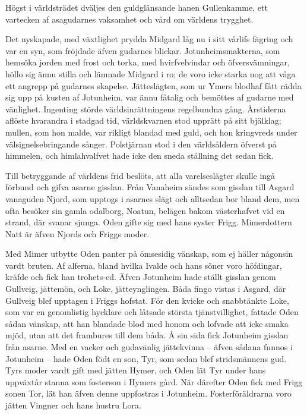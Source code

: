 Högst i världsträdet dväljes den guldglänsande hanen Gullenkamme, ett
vartecken af asagudarnes vaksamhet och vård om världens trygghet.






Det nyskapade, med växtlighet prydda Midgard låg nu i sitt vårlifs
fägring och var en syn, som fröjdade äfven gudarnes blickar.
Jotunheimsmakterna, som hemsöka jorden med frost och torka, med
hvirfvelvindar och öfversvämningar, höllo sig ännu stilla och lämnade
Midgard i ro; de voro icke starka nog att våga ett angrepp på gudarnes
skapelse. Jätteslägten, som ur Ymers blodhaf fått rädda sig upp på
kusten af Jotunheim, var ännu fåtalig och bemöttes af gudarne med
vänlighet. Ingenting störde världsinrättningens regelbundna gång.
Årstiderna aflöste hvarandra i stadgad tid, världskvarnen stod upprätt
på sitt bjälklag; mullen, som hon malde, var rikligt blandad med guld,
och hon kringvreds under välsignelsebringande sånger. Polstjärnan stod i
den världsåldern öfverst på himmelen, och himlahvalfvet hade icke den
sneda ställning det sedan fick.

Till betryggande af världens frid beslöts, att alla varelseslägter
skulle ingå förbund och gifva asarne gisslan. Från Vanaheim sändes som
gisslan till Asgard vanaguden Njord, som upptogs i asarnes slägt och
alltsedan bor bland dem, men ofta besöker sin gamla odalborg, Noatun,
belägen bakom västerhafvet vid en strand, där svanar sjunga. Oden gifte
sig med hans syster Frigg. Mimerdottern Natt är äfven Njords och Friggs
moder.

Med Mimer utbytte Oden panter på ömsesidig vänskap, som ej häller
någonsin vardt bruten. Af alferna, bland hvilka Ivalde och hans söner
voro höfdingar, kräfde och fick han trohets-ed. Äfven Jotunheim hade
ställt gisslan genom Gullveig, jättemön, och Loke, jätteynglingen. Båda
fingo vistas i Asgard, där Gullveig blef upptagen i Friggs hofstat. För
den kvicke och snabbtänkte Loke, som var en genomlistig hycklare och
låtsade största tjänstvillighet, fattade Oden sådan vänskap, att han
blandade blod med honom och lofvade att icke smaka mjöd, utan att det
frambures till dem båda. Å sin sida fick Jotunheim gisslan från asarne.
Med en vacker och gudavänlig jättekvinna -- äfven sådana funnos i
Jotunheim -- hade Oden födt en son, Tyr, som sedan blef stridsmännens
gud. Tyrs moder vardt gift med jätten Hymer, och Oden lät Tyr under hans
uppväxtår stanna som fosterson i Hymers gård. När därefter Oden fick med
Frigg sonen Tor, lät han äfven denne uppfostras i Jotunheim.
Fosterföräldrarna voro jätten Vingner och hans hustru Lora.

